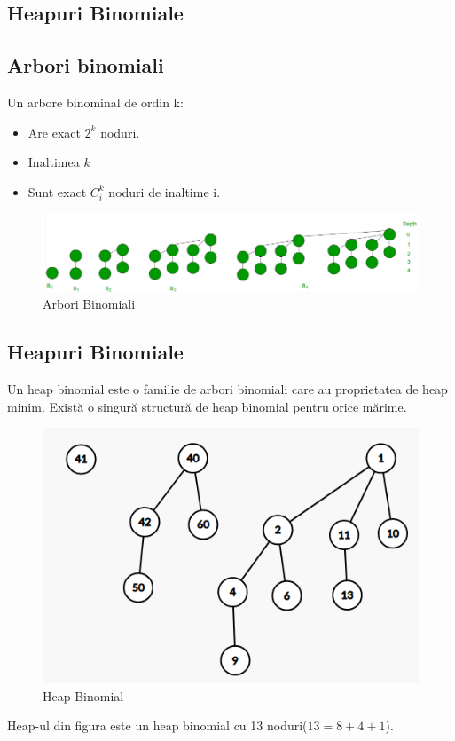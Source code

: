 \documentclass[11pt,a4paper]{article}
\theoremstyle{definition}
\theoremstyle{plain}
\theoremstyle{remark}
\begin{document}
\subsection{Heapuri Binomiale}
\subsection*{Arbori binomiali}
Un arbore binominal de ordin k:
\begin{itemize}
    \item Are exact $2^{k}$ noduri.
    \item Inaltimea $k$
    \item Sunt exact $C_{i}^{k}$ noduri de inaltime i.
\end{itemize}
\begin{figure}[H]
    \centering
    \includegraphics[width=0.85\linewidth]{arbori-binomiali.png}
    \caption{Arbori Binomiali}
    \label{fig:enter-label}
\end{figure}

\subsection{Heapuri Binomiale}
Un heap binomial este o familie de arbori binomiali care au proprietatea de heap minim. Există o singură structură de heap binomial pentru orice mărime.

\begin{figure}[H]
    \centering
    \includegraphics[width=0.6\linewidth]{exemplu-heap-binomial.png}
    \caption{Heap Binomial}
    \label{fig:enter-label}
\end{figure}

Heap-ul din figura este un heap binomial cu 13 noduri($13 = 8 + 4 + 1$).
\end{document}
